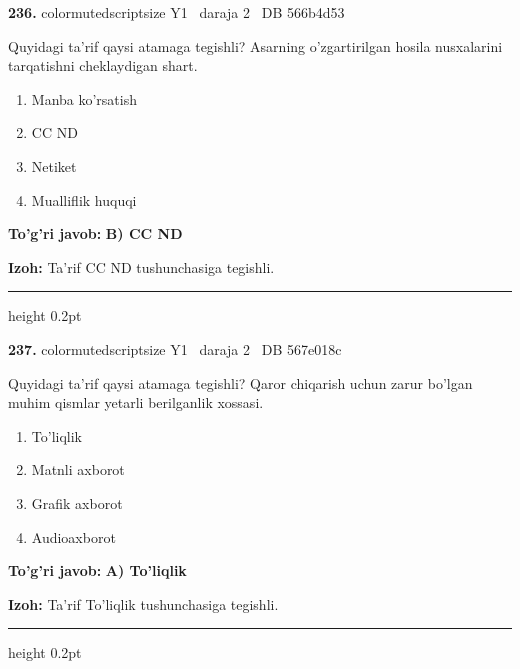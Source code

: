 \documentclass[10pt,a4paper,oneside]{article}
\begin{document}
\noindent\textbf{\color{ink}236.}  {color{muted}scriptsize Y1 \textbullet\ daraja 2 \textbullet\ DB 566b4d53}
\par
Quyidagi ta'rif qaysi atamaga tegishli? Asarning o'zgartirilgan hosila nusxalarini tarqatishni cheklaydigan shart.
\begin{enumerate}[label=\Alph*),leftmargin=9mm]
\item Manba ko'rsatish
\item CC ND
\item Netiket
\item Mualliflik huquqi
\end{enumerate}
\begin{tcolorbox}[enhanced,breakable,colback=teal!4,colframe=teal!50!black,boxrule=0.5pt,arc=1.1mm,left=3mm,right=3mm,top=1.7mm,bottom=1.7mm,before skip=2mm,after skip=2mm]
\textbf{\color{teal}To'g'ri javob:} \textbf{B) CC ND}
\par\smallskip
\textbf{Izoh:} Ta'rif CC ND tushunchasiga tegishli.
\end{tcolorbox}
\vspace{2mm}\hrule height 0.2pt \vspace{3mm}

\noindent\textbf{\color{ink}237.}  {color{muted}scriptsize Y1 \textbullet\ daraja 2 \textbullet\ DB 567e018c}
\par
Quyidagi ta'rif qaysi atamaga tegishli? Qaror chiqarish uchun zarur bo'lgan muhim qismlar yetarli berilganlik xossasi.
\begin{enumerate}[label=\Alph*),leftmargin=9mm]
\item To'liqlik
\item Matnli axborot
\item Grafik axborot
\item Audioaxborot
\end{enumerate}
\begin{tcolorbox}[enhanced,breakable,colback=teal!4,colframe=teal!50!black,boxrule=0.5pt,arc=1.1mm,left=3mm,right=3mm,top=1.7mm,bottom=1.7mm,before skip=2mm,after skip=2mm]
\textbf{\color{teal}To'g'ri javob:} \textbf{A) To'liqlik}
\par\smallskip
\textbf{Izoh:} Ta'rif To'liqlik tushunchasiga tegishli.
\end{tcolorbox}
\vspace{2mm}\hrule height 0.2pt \vspace{3mm}
\end{document}
